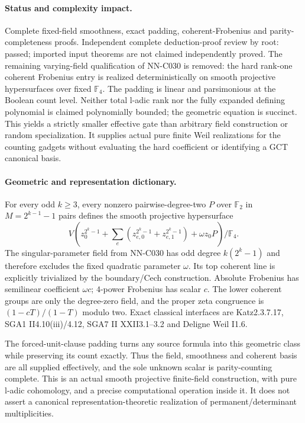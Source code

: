 \paragraph{Status and complexity impact.}
Complete fixed-field smoothness, exact padding, coherent-Frobenius and parity-completeness proofs. Independent complete deduction-proof review by root: passed; imported input theorems are not claimed independently proved. The remaining varying-field qualification of NN-C030 is removed: the hard rank-one coherent Frobenius entry is realized deterministically on smooth projective hypersurfaces over fixed $\mathbb F_4$. The padding is linear and parsimonious at the Boolean count level. Neither total l-adic rank nor the fully expanded defining polynomial is claimed polynomially bounded; the geometric equation is succinct. This yields a strictly smaller effective gate than arbitrary field construction or random specialization. It supplies actual pure finite Weil realizations for the counting gadgets without evaluating the hard coefficient or identifying a GCT canonical basis.

\paragraph{Geometric and representation dictionary.}
For every odd $k\geq3$, every nonzero pairwise-degree-two $P$ over $\mathbb F_2$ in $M=2^{k-1}-1$ pairs defines the smooth projective hypersurface
\[
 V\left(z_0^{2^k-1}+\sum_e(z_{e,0}^{2^k-1}+z_{e,1}^{2^k-1})
                        +\omega z_0P\right)/\mathbb F_4.
\]
The singular-parameter field from NN-C030 has odd degree $k(2^k-1)$ and therefore excludes the fixed quadratic parameter $\omega$. Its top coherent line is explicitly trivialized by the boundary/Cech construction. Absolute Frobenius has semilinear coefficient $\omega c$; $4$-power Frobenius has scalar $c$. The lower coherent groups are only the degree-zero field, and the proper zeta congruence is $(1-cT)/(1-T)$ modulo two. Exact classical interfaces are Katz2.3.7.17, SGA1 II4.10(iii)/4.12, SGA7 II XXII3.1--3.2 and Deligne Weil I1.6.

The forced-unit-clause padding turns any source formula into this geometric class while preserving its count exactly. Thus the field, smoothness and coherent basis are all supplied effectively, and the sole unknown scalar is parity-counting complete. This is an actual smooth projective finite-field construction, with pure l-adic cohomology, and a precise computational operation inside it. It does not assert a canonical representation-theoretic realization of permanent/determinant multiplicities.



